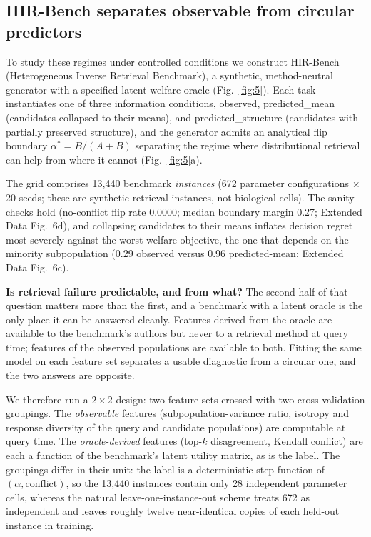 \documentclass[11pt,letterpaper]{article}
\begin{document}
\begin{figure}[!htbp]
\label{fig:6}
\end{figure}

\subsection*{HIR-Bench separates observable from circular predictors}

To study these regimes under controlled conditions we construct HIR-Bench (Heterogeneous
Inverse Retrieval Benchmark), a synthetic, method-neutral generator with a specified
latent welfare oracle (Fig.~\ref{fig:5}). Each task instantiates one of three information
conditions, observed, predicted\_mean (candidates collapsed to their
means), and predicted\_structure (candidates with partially preserved structure),
and the generator admits an analytical flip boundary $\alpha^* = B/(A+B)$ separating the
regime where distributional retrieval can help from where it cannot (Fig.~\ref{fig:5}a).

The grid comprises 13,440 benchmark \emph{instances} (672 parameter configurations
$\times$ 20 seeds; these are synthetic retrieval instances, not biological cells). The
sanity checks hold (no-conflict flip rate 0.0000; median boundary margin 0.27; Extended
Data Fig.~6d), and collapsing candidates to their means inflates decision regret most
severely against the worst-welfare objective, the one that depends on the minority
subpopulation (0.29 observed versus 0.96 predicted-mean; Extended Data Fig.~6c).

\textbf{Is retrieval failure predictable, and from what?} The second half of that question
matters more than the first, and a benchmark with a latent oracle is the only place it can
be answered cleanly. Features derived from the oracle are available to the benchmark's
authors but never to a retrieval method at query time; features of the observed
populations are available to both. Fitting the same model on each feature set separates a
usable diagnostic from a circular one, and the two answers are opposite.

We therefore run a $2\times2$ design: two feature sets crossed with two cross-validation
groupings. The \emph{observable} features (subpopulation-variance ratio, isotropy and response
diversity of the query and candidate populations) are computable at query time. The
\emph{oracle-derived} features (top-$k$ disagreement, Kendall conflict) are each a function of
the benchmark's latent utility matrix, as is the label. The groupings differ in their unit: the
label is a deterministic step function of $(\alpha, \mathrm{conflict})$, so the 13,440 instances
contain only 28 independent parameter cells, whereas the natural leave-one-instance-out
scheme treats 672 as independent and leaves roughly twelve near-identical copies of each held-out
instance in training.
\end{document}
